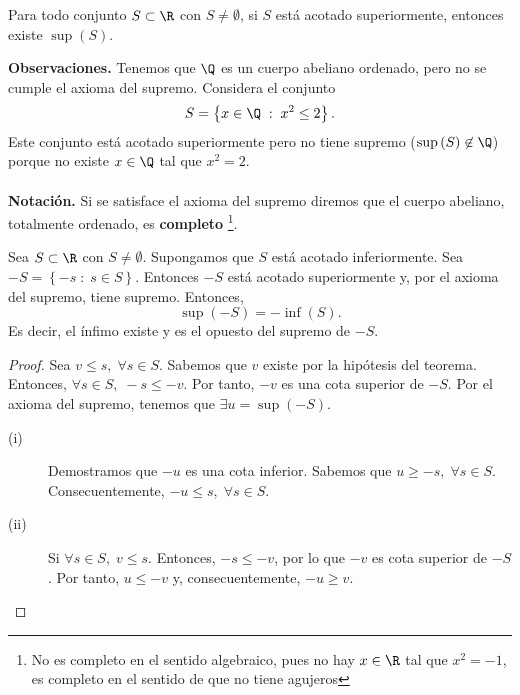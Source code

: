 \begin{faxiom}
\normalfont Para todo conjunto $\displaystyle S \subset \R $ con $\displaystyle S \neq \emptyset $, si $\displaystyle S $ está acotado superiormente, entonces existe $\displaystyle \sup\left(S\right) $.
\end{faxiom}

\textbf{Observaciones.} Tenemos que $\displaystyle \Q $ es un cuerpo abeliano ordenado, pero no se cumple el axioma del supremo. Considera el conjunto 
\[S = \left\{ x \in \Q \; : \; x^{2} \leq 2\right\}  .\]
Este conjunto está acotado superiormente pero no tiene supremo ($\displaystyle \sup\left(S\right)\not\in \Q $) porque no existe $\displaystyle x \in \Q $ tal que $\displaystyle x^{2} = 2 $. \\ \\
\textbf{Notación.} Si se satisface el axioma del supremo diremos que el cuerpo abeliano, totalmente ordenado, es \textbf{completo} \footnote{No es completo en el sentido algebraico, pues no hay $\displaystyle x \in \R $ tal que $\displaystyle x^{2}=-1 $, es completo en el sentido de que no tiene agujeros}. 

\begin{ftheorem}[]
	\normalfont Sea $\displaystyle S \subset \R $  con $\displaystyle S \neq \emptyset $. Supongamos que $\displaystyle S $ está acotado inferiormente. Sea $\displaystyle - S = \left\{ - s \; : \; s \in S\right\}  $. Entonces $\displaystyle -S $ está acotado superiormente y, por el axioma del supremo, tiene supremo. Entonces, 
	\[\sup\left(-S\right) = - \inf\left(S\right) .\]
Es decir, el ínfimo existe y es el opuesto del supremo de $\displaystyle - S $.
\end{ftheorem}

\begin{proof}
Sea $\displaystyle v \leq s, \; \forall s \in S$. Sabemos que $\displaystyle v $ existe por la hipótesis del teorema. Entonces, $\displaystyle \forall s \in S, \; - s \leq - v $. Por tanto, $\displaystyle - v $ es una cota superior de $\displaystyle -S $. Por el axioma del supremo, tenemos que $\displaystyle \exists u = \sup\left(- S\right) $. 
\begin{description}
\item[(i)] Demostramos que $\displaystyle -u $ es una cota inferior. Sabemos que $\displaystyle u \geq - s, \; \forall s \in S $. Consecuentemente, $\displaystyle - u \leq s, \; \forall s \in S $. 
\item[(ii)] Si $\displaystyle \forall s \in S, \; v \leq s $. Entonces, $\displaystyle -s \leq - v $, por lo que $\displaystyle -v $ es cota superior de $\displaystyle -S $. Por tanto, $\displaystyle u \leq - v $ y, consecuentemente, $\displaystyle - u \geq v $.
\end{description}
\end{proof}


